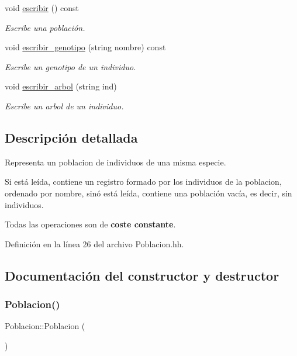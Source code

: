 \begin{DoxyCompactItemize}
void \hyperlink{class_poblacion_a2b14ac61ad3c062ce8d9c30cdee05923}{escribir} () const
\begin{DoxyCompactList}\small\item\em Escribe una población. \end{DoxyCompactList}\item 
void \hyperlink{class_poblacion_a1f86f933c6bf832f8c5b836477f8cbe9}{escribir\+\_\+genotipo} (string nombre) const
\begin{DoxyCompactList}\small\item\em Escribe un genotipo de un individuo. \end{DoxyCompactList}\item 
void \hyperlink{class_poblacion_a44518707081153d520d7781ea7691b19}{escribir\+\_\+arbol} (string ind)
\begin{DoxyCompactList}\small\item\em Escribe un arbol de un individuo. \end{DoxyCompactList}\end{DoxyCompactItemize}


\subsection{Descripción detallada}
Representa un poblacion de individuos de una misma especie. 

Si está leída, contiene un registro formado por los individuos de la poblacion, ordenado por nombre, sinó está leída, contiene una población vacía, es decir, sin individuos.

Todas las operaciones son de {\bfseries coste constante}. 

Definición en la línea 26 del archivo Poblacion.\+hh.



\subsection{Documentación del constructor y destructor}
\mbox{\label{class_poblacion_ad3909b6ea27344b861b7cd548cb2b65e}} 
\subsubsection{\texorpdfstring{Poblacion()}{Poblacion()}}
{\footnotesize\ttfamily Poblacion\+::\+Poblacion (\begin{DoxyParamCaption}{ }\end{DoxyParamCaption})}



